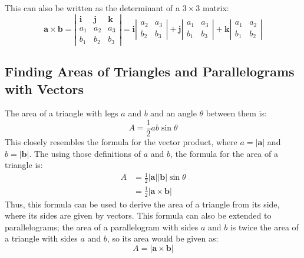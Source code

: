         This can also be written as the determinant of a $3\times3$ matrix:
        \begin{equation}
            \mathbf{a}\times\mathbf{b}=\left|\begin{matrix}
                \mathbf{i} & \mathbf{j} & \mathbf{k} \\
                a_1 & a_2 & a_3 \\
                b_1 & b_2 & b_3
            \end{matrix}\right|=\mathbf{i}
            \left|\begin{matrix}
                a_2 & a_3 \\
                b_2 & b_3
            \end{matrix}\right|+\mathbf{j}
            \left|\begin{matrix}
                a_1 & a_3 \\
                b_1 & b_3
            \end{matrix}\right|+\mathbf{k}
            \left|\begin{matrix}
                a_1 & a_2 \\
                b_1 & b_2
            \end{matrix}\right|
        \end{equation}

    \subsection{Finding Areas of Triangles and Parallelograms with Vectors}
        The area of a triangle with legs $a$ and $b$ and an angle $\theta$ between them is:
        \begin{equation}
            A=\frac{1}{2}ab\sin\theta
        \end{equation}
        This closely resembles the formula for the vector product, where $a=|\mathbf{a}|$ and $b=|\mathbf{b}|$.
        The using those definitions of $a$ and $b$, the formula for the area of a triangle is:
        \begin{equation}
        \begin{aligned}
            A&=\frac{1}{2}|\mathbf{a}||\mathbf{b}|\sin\theta \\
            &=\frac{1}{2}|\mathbf{a}\times\mathbf{b}|
        \end{aligned}
        \end{equation}
        Thus, this formula can be used to derive the area of a triangle from its side, where its sides are given by vectors.
        This formula can also be extended to parallelograms; the area of a parallelogram with sides $a$ and $b$ is twice the area of a triangle with sides $a$ and $b$, so its area would be given as:
        \begin{equation}
            A=|\mathbf{a}\times\mathbf{b}|
        \end{equation}

